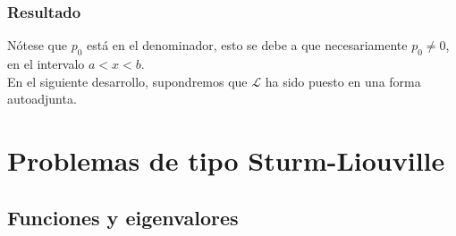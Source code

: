 \documentclass[12pt]{beamer}
\begin{document}
\begin{frame}
\frametitle{Resultado}
Nótese que $p_{0}$ está en el denominador, esto se debe a que necesariamente $p_{0} \neq 0$, en el intervalo $a < x < b$.
\\
\bigskip
\pause
En el siguiente desarrollo, supondremos que $\mathcal{L}$ ha sido puesto en una forma autoadjunta.
\end{frame}

\section{Problemas de tipo Sturm-Liouville}
\subsection{Funciones y eigenvalores}
\end{document}
